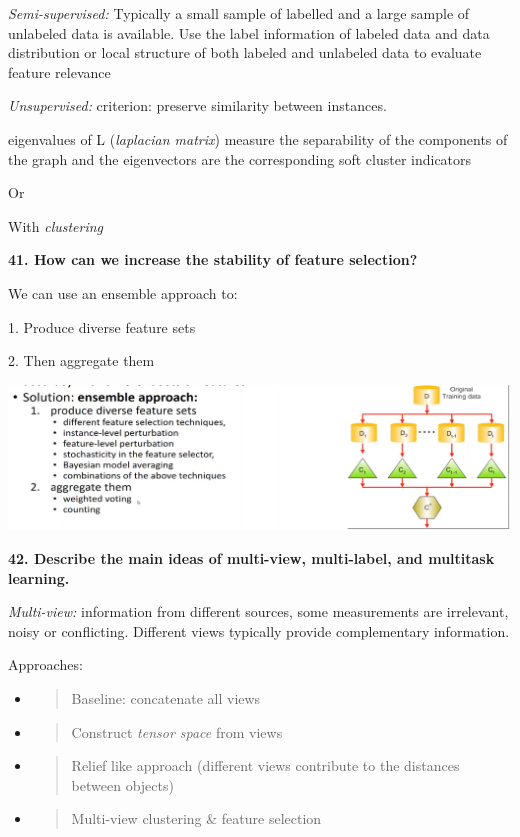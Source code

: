 \textit{Semi-supervised:} Typically a small sample of labelled and a
large sample of unlabeled data is available. Use the label information
of labeled data and data distribution or local structure of both labeled
and unlabeled data to evaluate feature relevance

\textit{Unsupervised:} criterion: preserve similarity between
instances.

eigenvalues of L (\emph{laplacian matrix}) measure the separability of
the components of the graph and the eigenvectors are the corresponding
soft cluster indicators

Or

With \emph{clustering}

\textbf{41. How can we increase the stability of feature selection?}

We can use an ensemble approach to:

1. Produce diverse feature sets

2. Then aggregate them

\includegraphics[width=\columnwidth]{media/image36.png}

\textbf{42. Describe the main ideas of multi-view, multi-label, and
multitask learning.}

\textit{Multi-view:} information from different sources, some
measurements are irrelevant, noisy or conflicting. Different views
typically provide complementary information.

Approaches:

\begin{itemize}
\item
  \begin{quote}
  Baseline: concatenate all views
  \end{quote}
\item
  \begin{quote}
  Construct \emph{tensor space} from views
  \end{quote}
\item
  \begin{quote}
  Relief like approach (different views contribute to the distances
  between objects)
  \end{quote}
\item
  \begin{quote}
  Multi-view clustering \& feature selection
  \end{quote}
\end{itemize}

